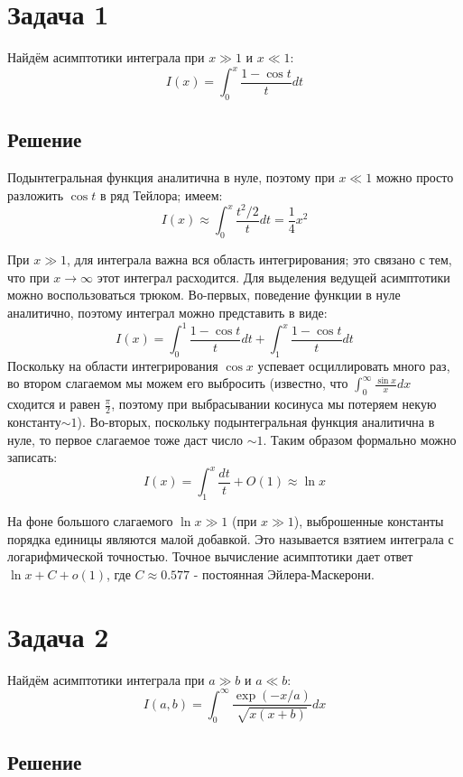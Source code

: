\documentclass[a4paper,12pt]{article}
\begin{document}
\section*{Задача 1}

Найдём асимптотики интеграла при $x\gg1$ и $x\ll1$:
\[
I(x)=\int_{0}^{x}\frac{1-\cos t}{t}dt
\]



\subsection*{Решение}

Подынтегральная функция аналитична в нуле, поэтому при $x\ll1$ можно
просто разложить $\cos t$ в ряд Тейлора; имеем:
\[
I\left(x\right)\approx\int_{0}^{x}\frac{t^{2}/2}{t}dt=\frac{1}{4}x^{2}
\]

\noindent
При $x\gg1$, для интеграла важна вся область интегрирования; это
связано с тем, что при $x\to\infty$ этот интеграл расходится. Для
выделения ведущей асимптотики можно воспользоваться трюком. Во-первых,
поведение функции в нуле аналитично, поэтому интеграл можно представить
в виде:
\[
I\left(x\right)=\int_{0}^{1}\frac{1-\cos t}{t}dt+\int_{1}^{x}\frac{1-\cos t}{t}dt
\]
Поскольку на области интегрирования $\cos x$ успевает осциллировать
много раз, во втором слагаемом мы можем его выбросить (известно, что
$\int_{0}^{\infty}\frac{\sin x}{x}dx$ сходится и равен $\frac{\pi}{2}$,
поэтому при выбрасывании косинуса мы потеряем некую константу$\sim1$).
Во-вторых, поскольку подынтегральная функция аналитична в нуле, то
первое слагаемое тоже даст число $\sim1$. Таким образом формально
можно записать:
\[
I\left(x\right)=\int_{1}^{x}\frac{dt}{t}+O(1)\approx\ln x
\]

\noindent
На фоне большого слагаемого $\ln x\gg1$ (при $x\gg1$), выброшенные
константы порядка единицы являются малой добавкой. Это называется
взятием интеграла с логарифмической точностью. Точное вычисление асимптотики
дает ответ $\ln x+C+o(1)$, где $C\approx0.577$ - постоянная Эйлера-Маскерони.


\section*{Задача 2}

Найдём асимптотики интеграла при $a\gg b$ и $a\ll b$:
\[
I(a,b)=\int_{0}^{\infty}\frac{\exp(-x/a)}{\sqrt{x(x+b)}}dx
\]



\subsection*{Решение}
\end{document}
